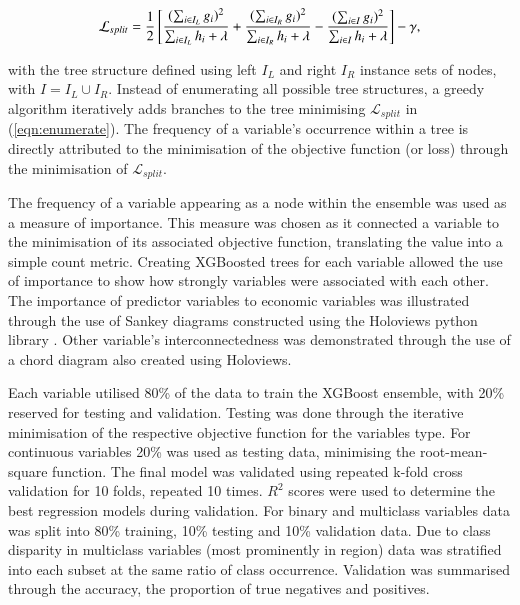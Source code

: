 \documentclass[review,12pt,authoryear]{elsarticle}
\begin{document}
\begin{linenumbers}
\begin{equation} \label{eqn:enumerate}
\mathcal{L}_{split} = {{1}\over{2}} \left[ 
 {{(\sum_{i\in I_L}g_i)^{2}}\over{\sum_{i\in I_L} h_i + \lambda}} +
 {{(\sum_{i\in I_R}g_i)^{2}}\over{\sum_{i\in I_R} h_i + \lambda}} -
 {{(\sum_{i\in I}{g_i})^{2}}\over{\sum_{i \in I} h_i + \lambda}} \right] - \gamma,
\end{equation}

with the tree structure defined using left $I_L$ and right $I_R$ instance sets of nodes, with $I = I_L \cup I_R$. Instead of enumerating all possible tree structures, a greedy algorithm iteratively adds branches to the tree minimising $ \mathcal{L}_{split} $ in (\ref{eqn:enumerate}). The frequency of a variable's occurrence within a tree is directly attributed to the minimisation of the objective function (or loss) through the minimisation of $ \mathcal{L}_{split} $.
\par
The frequency of a variable appearing as a node within the ensemble was used as a measure of importance. This measure was chosen as it connected a variable to the minimisation of its associated objective function, translating the value into a simple count metric. Creating XGBoosted trees for each variable allowed the use of importance to show how strongly variables were associated with each other. The importance of predictor variables to economic variables was illustrated through the use of Sankey diagrams constructed using the Holoviews python library \citep{philipp_rudiger_2020_3904606}. Other variable's interconnectedness was demonstrated through the use of a chord diagram also created using Holoviews.
\par
Each variable utilised 80\% of the data to train the XGBoost ensemble, with 20\% reserved for testing and validation. Testing was done through the iterative minimisation of the respective objective function for the variables type. For continuous variables 20\% was used as testing data, minimising the root-mean-square function. The final model was validated using repeated k-fold cross validation for 10 folds, repeated 10 times. $R^2$ scores were used to determine the best regression models during validation.
For binary and multiclass variables data was split into 80\% training, 10\% testing and 10\% validation data. Due to class disparity in multiclass variables (most prominently in region) data was stratified into each subset at the same ratio of class occurrence. Validation was summarised through the accuracy, the proportion of true negatives and positives.
\par

\end{linenumbers}
\end{document}
